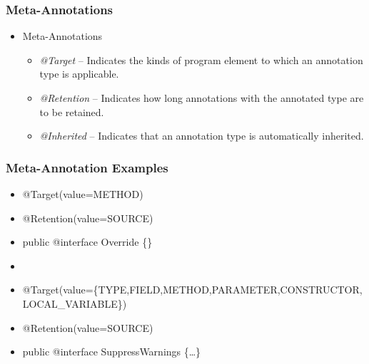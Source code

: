 \documentclass[10pt,xcolor=pdflatex]{beamer}
\begin{document}
\begin{frame}\frametitle{Meta-Annotations}
\begin{itemize}
	\item Meta-Annotations
      \begin{itemize}
        \item \emph{@Target} -- Indicates the kinds of program element to which an annotation type is applicable.
	    \item \emph{@Retention} -- Indicates how long annotations with the annotated type are to be retained.
        \item \emph{@Inherited} -- Indicates that an annotation type is automatically inherited. 
      \end{itemize}
\end{itemize}
\end{frame}


\begin{frame}\frametitle{Meta-Annotation Examples}
\begin{itemize}
	\item[] @Target(value=METHOD)
	\item[] @Retention(value=SOURCE)
    \item[] public @interface Override \{\}
    \item[]
	\item[] @Target(value=\{TYPE,FIELD,METHOD,PARAMETER,CONSTRUCTOR, LOCAL\_VARIABLE\})
	\item[] @Retention(value=SOURCE)
	\item[] public @interface SuppressWarnings \{\ldots\}
\end{itemize}
\end{frame}
\end{document}
